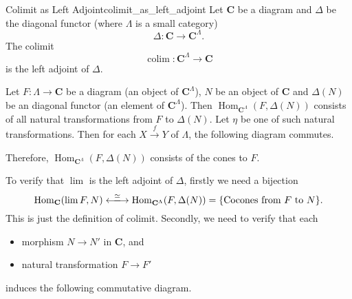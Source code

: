 \documentclass{article}
\begin{document}
\begin{example}{Colimit as Left Adjoint}{colimit_as_left_adjoint}
    Let $\mathbf{C}$ be a diagram and $\Delta$ be the diagonal functor (where $\Lambda$ is a small category)
    \[ \Delta: \mathbf{C} \rightarrow \mathbf{C}^\Lambda. \]
    The colimit
    \[ \operatorname{colim}: \mathbf{C}^\Lambda \rightarrow \mathbf{C} \]
    is the left adjoint of $\Delta$.
\end{example}
Let $F:\Lambda\rightarrow\mathbf{C}$ be a diagram (an object of $\mathbf{C}^\Lambda$), $N$ be an object of $\mathbf{C}$ and $\Delta(N)$ be an diagonal functor (an element of $\mathbf{C}^\Lambda$).
Then $\operatorname{Hom}_{\mathbf{C}^\Lambda}(F, \Delta(N))$ consists of all natural transformations from $F$ to $\Delta(N)$.
Let $\eta$ be one of such natural transformations.
Then for each $X\xrightarrow{f}Y$ of $\Lambda$, the following diagram commutes.
\begin{center}
\end{center}
Therefore, $\operatorname{Hom}_{\mathbf{C}^\Lambda}(F, \Delta(N))$ consists of the cones to $F$.
\par
To verify that  $\lim$ is the left adjoint of $\Delta$, firstly we need a bijection
\[ \operatorname{Hom}_{\mathbf{C}}(\lim F, N) \xlongleftrightarrow{\simeq} \operatorname{Hom}_{\mathbf{C}^\Lambda}(F, \Delta(N)) = \qty{\text{Cocones from } F \text{ to } N}. \]
This is just the definition of colimit.
Secondly, we need to verify that each
\begin{itemize}
    \item morphism $N\rightarrow N'$ in $\mathbf{C}$, and
    \item natural transformation $F\rightarrow F'$
\end{itemize}
induces the following commutative diagram.
\begin{center}
\end{center}
\end{document}

